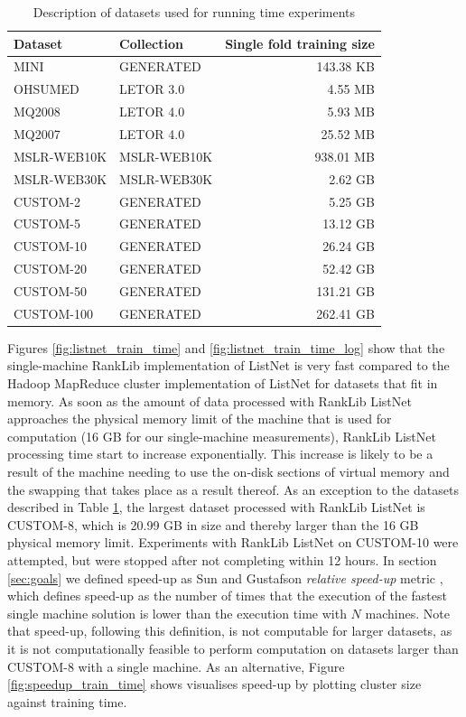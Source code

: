 \begin{table}[!h]
\centering
\begin{tabular}{p{3.4cm}p{3.4cm}r}\toprule
Dataset & Collection & Single fold training size \\
\midrule
MINI		& GENERATED		  & 143.38 KB\\
OHSUMED     & LETOR 3.0       &   4.55 MB\\
MQ2008      & LETOR 4.0       &   5.93 MB\\
MQ2007      & LETOR 4.0       &  25.52 MB\\
MSLR-WEB10K & MSLR-WEB10K     & 938.01 MB\\
MSLR-WEB30K & MSLR-WEB30K     &   2.62 GB\\
CUSTOM-2	& GENERATED		  &   5.25 GB\\
CUSTOM-5	& GENERATED		  &  13.12 GB\\
CUSTOM-10	& GENERATED		  &  26.24 GB\\
CUSTOM-20   & GENERATED       &  52.42 GB\\
CUSTOM-50	& GENERATED		  & 131.21 GB\\
CUSTOM-100	& GENERATED		  & 262.41 GB\\
\bottomrule
\end{tabular}
\caption{Description of datasets used for running time experiments}
\label{tbl:recap_datasets}
\end{table}

Figures \ref{fig:listnet_train_time} and \ref{fig:listnet_train_time_log} show that the single-machine RankLib implementation of ListNet is very fast compared to the Hadoop MapReduce cluster implementation of ListNet for datasets that fit in memory. As soon as the amount of data processed with RankLib ListNet approaches the physical memory limit of the machine that is used for computation (16 GB for our single-machine measurements), RankLib ListNet processing time start to increase exponentially. This increase is likely to be a result of the machine needing to use the on-disk sections of virtual memory and the swapping that takes place as a result thereof. As an exception to the datasets described in Table \ref{tbl:recap_datasets}, the largest dataset processed with RankLib ListNet is CUSTOM-8, which is 20.99 GB in size and thereby larger than the 16 GB physical memory limit. Experiments with RankLib ListNet on CUSTOM-10 were attempted, but were stopped after not completing within 12 hours. In section \ref{sec:goals} we defined speed-up as Sun and Gustafson \emph{relative speed-up} metric \cite{Sun1991}, which defines speed-up as the number of times that the execution of the fastest single machine solution is lower than the execution time with $N$ machines. Note that speed-up, following this definition, is not computable for larger datasets, as it is not computationally feasible to perform computation on datasets larger than CUSTOM-8 with a single machine. As an alternative, Figure \ref{fig:speedup_train_time} shows visualises speed-up by plotting cluster size against training time.\\


